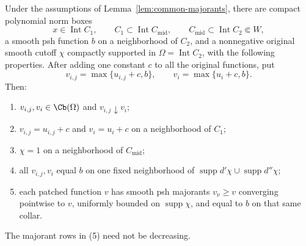 \begin{lemma}
\label{lem:smooth-collar}
Under the assumptions of Lemma~\ref{lem:common-majorants}, there are
compact polynomial norm boxes
\[
 x\in\operatorname{Int}C_1,\qquad
 C_1\subset\operatorname{Int}C_{\mathrm{mid}},\qquad
 C_{\mathrm{mid}}\subset\operatorname{Int}C_2\Subset W,
\]
a smooth psh function $b$ on a neighborhood of $C_2$, and a nonnegative
original smooth cutoff $\chi$ compactly supported in
$\Omega=\operatorname{Int}C_2$, with the following properties.
After adding one constant $c$ to all the original functions, put
\[
 v_{i,j}=\max\{u_{i,j}+c,b\},\qquad
 v_i=\max\{u_i+c,b\}.
\]
Then:
\begin{enumerate}
\item $v_{i,j},v_i\in\Cb(\Omega)$ and $v_{i,j}\downarrow v_i$;
\item $v_{i,j}=u_{i,j}+c$ and $v_i=u_i+c$ on a neighborhood of $C_1$;
\item $\chi=1$ on a neighborhood of $C_{\mathrm{mid}}$;
\item all $v_{i,j},v_i$ equal $b$ on one fixed neighborhood of
      $\operatorname{supp}d'\chi\cup\operatorname{supp}d''\chi$;
\item each patched function $v$ has smooth psh majorants $v_\nu\geq v$
      converging pointwise to $v$, uniformly bounded on $\operatorname{supp}\chi$,
      and equal to $b$ on that same collar.
\end{enumerate}
The majorant rows in (5) need not be decreasing.
\end{lemma}

